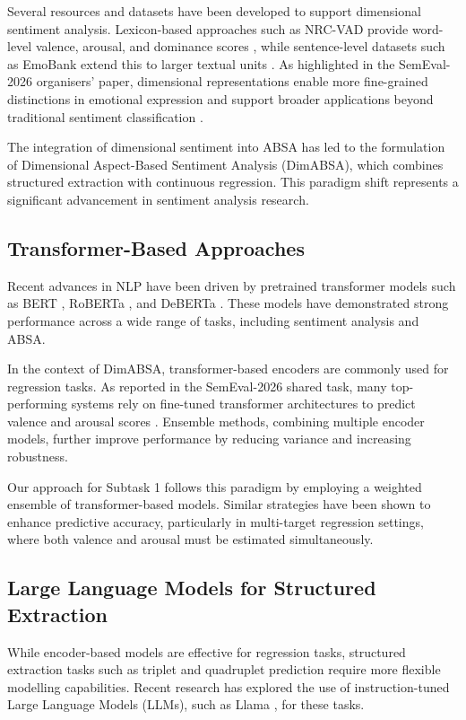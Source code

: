 \documentclass{article}
\begin{document}
Several resources and datasets have been developed to support dimensional sentiment analysis. Lexicon-based approaches such as NRC-VAD provide word-level valence, arousal, and dominance scores \cite{mohammad2018nrcvad}, while sentence-level datasets such as EmoBank extend this to larger textual units \cite{buechel2017emobank}. As highlighted in the SemEval-2026 organisers' paper, dimensional representations enable more fine-grained distinctions in emotional expression and support broader applications beyond traditional sentiment classification \cite{yu2026dimabsa}.

The integration of dimensional sentiment into ABSA has led to the formulation of Dimensional Aspect-Based Sentiment Analysis (DimABSA), which combines structured extraction with continuous regression. This paradigm shift represents a significant advancement in sentiment analysis research.

\subsection{Transformer-Based Approaches}

Recent advances in NLP have been driven by pretrained transformer models such as BERT \cite{devlin2019bert}, RoBERTa \cite{liu2019roberta}, and DeBERTa \cite{he2021deberta}. These models have demonstrated strong performance across a wide range of tasks, including sentiment analysis and ABSA.

In the context of DimABSA, transformer-based encoders are commonly used for regression tasks. As reported in the SemEval-2026 shared task, many top-performing systems rely on fine-tuned transformer architectures to predict valence and arousal scores \cite{yu2026dimabsa}. Ensemble methods, combining multiple encoder models, further improve performance by reducing variance and increasing robustness.

Our approach for Subtask 1 follows this paradigm by employing a weighted ensemble of transformer-based models. Similar strategies have been shown to enhance predictive accuracy, particularly in multi-target regression settings, where both valence and arousal must be estimated simultaneously.

\subsection{Large Language Models for Structured Extraction}

While encoder-based models are effective for regression tasks, structured extraction tasks such as triplet and quadruplet prediction require more flexible modelling capabilities. Recent research has explored the use of instruction-tuned Large Language Models (LLMs), such as Llama \cite{touvron2023llama}, for these tasks.
\end{document}
